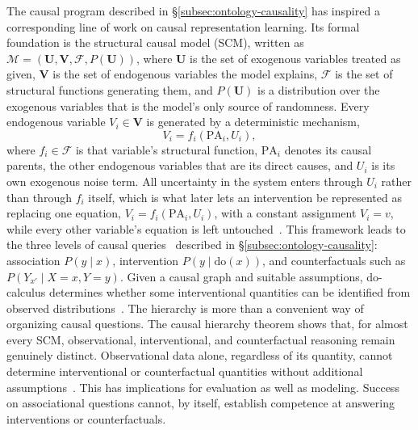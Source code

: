 \documentclass[acmsmall,screen,review,anonymous]{acmart}
\begin{document}
The causal program described in \S\ref{subsec:ontology-causality} has inspired a corresponding line of work on causal representation learning.
%
Its formal foundation is the structural causal model (SCM), written as $\mathcal{M} = (\mathbf{U}, \mathbf{V}, \mathcal{F}, P(\mathbf{U}))$, where $\mathbf{U}$ is the set of exogenous variables treated as given, $\mathbf{V}$ is the set of endogenous variables the model explains, $\mathcal{F}$ is the set of structural functions generating them, and $P(\mathbf{U})$ is a distribution over the exogenous variables that is the model's only source of randomness.
%
Every endogenous variable $V_i \in \mathbf{V}$ is generated by a deterministic mechanism, $$V_i = f_i(\mathrm{PA}_i, U_i),$$ where $f_i \in \mathcal{F}$ is that variable's structural function, $\mathrm{PA}_i$ denotes its causal parents, the other endogenous variables that are its direct causes, and $U_i$ is its own exogenous noise term.
%
All uncertainty in the system enters through $U_i$ rather than through $f_i$ itself, which is what later lets an intervention be represented as replacing one equation, $V_i = f_i(\mathrm{PA}_i, U_i)$, with a constant assignment $V_i = v$, while every other variable's equation is left untouched~\citep{pearl2009}.
%
This framework leads to the three levels of causal queries~\citep{pearl2018} described in \S\ref{subsec:ontology-causality}: association $P(y\mid x)$, intervention $P(y\mid\mathrm{do}(x))$, and counterfactuals such as $P(Y_{x'}\mid X=x,Y=y)$.
%
Given a causal graph and suitable assumptions, do-calculus determines whether some interventional quantities can be identified from observed distributions~\citep{pearl2009, shpitser2008}.
%
The hierarchy is more than a convenient way of organizing causal questions.
%
The causal hierarchy theorem shows that, for almost every SCM, observational, interventional, and counterfactual reasoning remain genuinely distinct.
%
Observational data alone, regardless of its quantity, cannot determine interventional or counterfactual quantities without additional assumptions~\citep{NEURIPS2021_5989add1, bareinboim2022hierarchy}. 
%
This has implications for evaluation as well as modeling.
%
Success on associational questions cannot, by itself, establish competence at answering interventions or counterfactuals.
\end{document}
